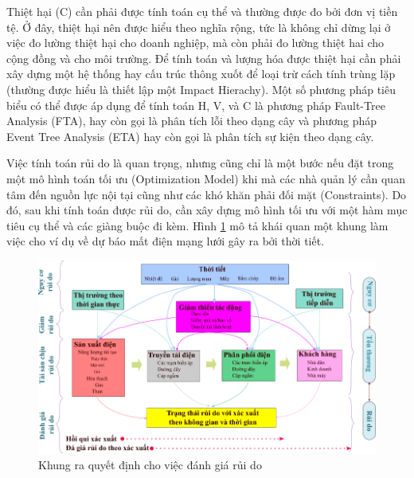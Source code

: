 \documentclass[utf8]{frontiersSCNS} %
\begin{document}
Thiệt hại (C) cần phải được tính toán cụ thể và thường được đo bởi đơn vị tiền tệ. Ở đây, thiệt hại nên được hiểu theo nghĩa rộng, tức là không chỉ dừng lại ở việc đo lường thiệt hại cho doanh nghiệp, mà còn phải đo lường thiệt hai cho cộng đồng và cho môi trường. Để tính toán và lượng hóa được thiệt hại cần phải xây dựng một hệ thống hay cấu trúc thông xuốt để loại trừ cách tính trùng lặp (thường được hiểu là thiết lập một Impact Hierachy). Một số phương pháp tiêu biểu có thể được áp dụng để tính toán H, V, và C là phương pháp Fault-Tree Analysis (FTA), hay còn gọi là phân tích lỗi theo dạng cây và phương pháp Event Tree Analysis (ETA) hay còn gọi là phân tích sự kiện theo dạng cây.


Việc tính toán rủi do là quan trọng, nhưng cũng chỉ là một bước nếu đặt trong một mô hình toán tối ưu (Optimization Model) khi mà các nhà quản lý cần quan tâm đến nguồn lực nội tại cũng như các khó khăn phải đối mặt (Constraints). Do đó, sau khi tính toán được rủi do, cần xây dựng mô hình tối ưu với một hàm mục tiêu cụ thể và các giàng buộc đi kèm. Hình \ref{fig:3} mô tả khái quan một khung làm việc cho ví dụ về dự báo mất điện mạng lưới gây ra bởi thời tiết.

\FloatBarrier
\begin{figure}[h]
	\centering
	\begin{center}
		\includegraphics[width=15cm]{decisionmaking-risk}%
	\end{center}
	\caption{Khung ra quyết định cho việc đánh giá rủi do}\label{fig:3}
\end{figure}
\FloatBarrier
\end{document}

